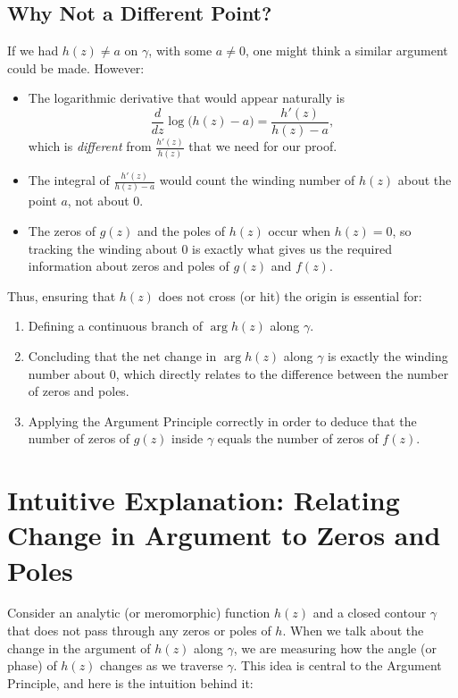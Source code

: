 \documentclass[12pt]{article}
\theoremstyle{definition} %
\theoremstyle{plain} %
\begin{document}
\subsection*{Why Not a Different Point?}
If we had $h(z)\neq a$ on $\gamma$, with some $a\neq 0$, one might think a similar argument could be made. However:
\begin{itemize}
    \item The logarithmic derivative that would appear naturally is 
          \[
            \frac{d}{dz}\log\bigl(h(z)-a\bigr) = \frac{h'(z)}{h(z)-a},
          \]
          which is \emph{different} from $\frac{h'(z)}{h(z)}$ that we need for our proof.
    \item The integral of $\frac{h'(z)}{h(z)-a}$ would count the winding number of $h(z)$ about the point $a$, not about $0$.  
    \item The zeros of $g(z)$ and the poles of $h(z)$ occur when $h(z)=0$, so tracking the winding about $0$ is exactly what gives us the required information about zeros and poles of $g(z)$ and $f(z)$.
\end{itemize}

Thus, ensuring that $h(z)$ does not cross (or hit) the origin is essential for:
\begin{enumerate}
    \item Defining a continuous branch of $\arg h(z)$ along $\gamma$.
    \item Concluding that the net change in $\arg h(z)$ along $\gamma$ is exactly the winding number about $0$, which directly relates to the difference between the number of zeros and poles.
    \item Applying the Argument Principle correctly in order to deduce that the number of zeros of $g(z)$ inside $\gamma$ equals the number of zeros of $f(z)$.
\end{enumerate}

\section*{Intuitive Explanation: Relating Change in Argument to Zeros and Poles}

Consider an analytic (or meromorphic) function \( h(z) \) and a closed contour \(\gamma\) that does not pass through any zeros or poles of \( h \). When we talk about the change in the argument of \( h(z) \) along \(\gamma\), we are measuring how the angle (or phase) of \( h(z) \) changes as we traverse \(\gamma\). This idea is central to the Argument Principle, and here is the intuition behind it:
\end{document}
